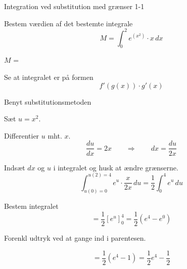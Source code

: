\documentclass{article}
\begin{document}
\tableofcontents

\begin{exercise}{Integration ved substitution med grænser 1-1}


Bestem værdien af det bestemte integrale
\[
M = \int_0^2 e^{(x^2)} \cdot x \, dx
\]

$M$ = 



\hint

Se at integralet er på formen
\[
f'(g(x)) \cdot g'(x)
\]

\hint

Benyt substitutionsmetoden

\hint

Sæt $u=x^2$.


\hint

Differentier $u$ mht. $x$.
\[
\frac{du}{dx} = 2x \qquad\Rightarrow \qquad dx = \frac{du}{2x}
\]

\hint

Indsæt $dx$ og $u$ i integralet og husk at ændre grænserne.
\[
\int_{u(0)=0}^{u(2)=4} e^{u} \cdot \frac{x}{2x} \, du = \frac{1}{2} \int_{0}^{4} e^u \, du
\]



\hint

Bestem integralet
\[
= \frac{1}{2} \left[e^u\right]_0^4 = \frac{1}{2} \left( e^4 - e^0 \right)
\]

\hint
Forenkl udtryk ved at gange ind i parentesen.

\hint

\[
= \frac{1}{2} \left( e^4 - 1 \right) = \frac{1}{2} e^4 - \frac{1}{2}
\]



\end{exercise}

\newpage
\end{document}

